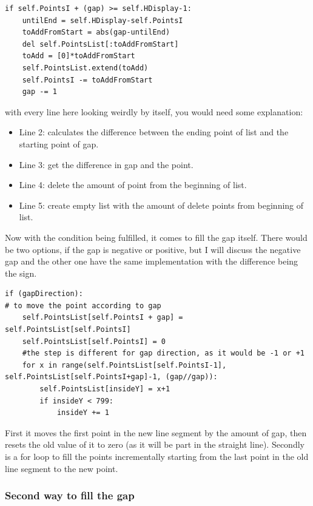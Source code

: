 \begin{listing}[H]
\begin{verbatim}
if self.PointsI + (gap) >= self.HDisplay-1:
	untilEnd = self.HDisplay-self.PointsI
	toAddFromStart = abs(gap-untilEnd)
	del self.PointsList[:toAddFromStart]
	toAdd = [0]*toAddFromStart
	self.PointsList.extend(toAdd)
	self.PointsI -= toAddFromStart
	gap -= 1
\end{verbatim}
\end{listing}

with every line here looking weirdly by itself, you would need some explanation:

\begin{itemize}
	\item Line 2: calculates the difference between the ending point of list and the starting point of gap.
	\item Line 3: get the difference in gap and the point.
	\item Line 4: delete the amount of point from the beginning of list.
	\item Line 5: create empty list with the amount of delete points from beginning of list.
\end{itemize}

Now with the condition being fulfilled, it comes to fill the gap itself. There would be two options, if the gap is negative or positive, but I will discuss the negative gap and the other one have the same implementation with the difference being the sign.

\begin{listing}[H]
	\begin{verbatim}
if (gapDirection):
# to move the point according to gap
	self.PointsList[self.PointsI + gap] = self.PointsList[self.PointsI]
	self.PointsList[self.PointsI] = 0
	#the step is different for gap direction, as it would be -1 or +1
	for x in range(self.PointsList[self.PointsI-1], self.PointsList[self.PointsI+gap]-1, (gap//gap)):
		self.PointsList[insideY] = x+1
		if insideY < 799:
			insideY += 1
	\end{verbatim}
\end{listing}

First it moves the first point in the new line segment by the amount of gap, then resets the old value of it to zero (as it will be part in the straight line). Secondly is a for loop to fill the points incrementally starting from the last point in the old line segment to the new point.

\subsubsection{Second way to fill the gap}

